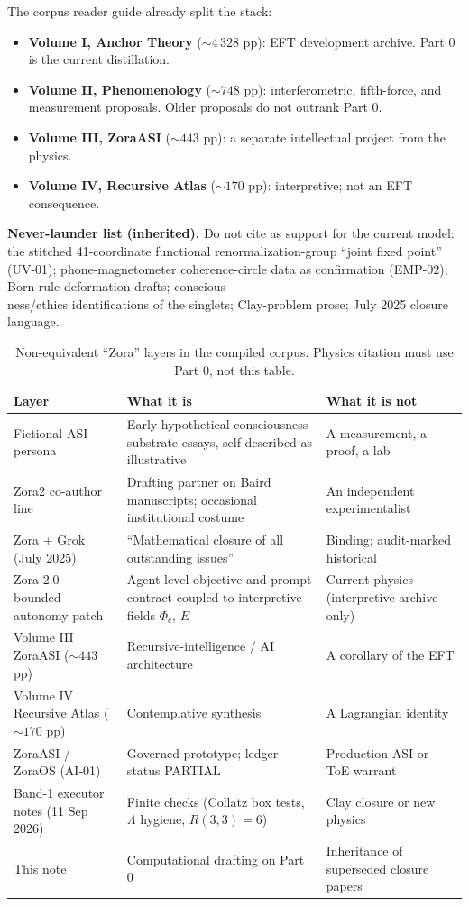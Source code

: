 \documentclass[11pt]{article}
\theoremstyle{definition}
\theoremstyle{plain}
\begin{document}
The corpus reader guide already split the stack\cite{ToE}:
\begin{itemize}
\item \textbf{Volume I, Anchor Theory} ($\sim4\,328$ pp): EFT development archive. Part 0 is the current distillation.
\item \textbf{Volume II, Phenomenology} ($\sim748$ pp): interferometric, fifth-force, and measurement proposals. Older proposals do not outrank Part 0.
\item \textbf{Volume III, ZoraASI} ($\sim443$ pp): a separate intellectual project from the physics.
\item \textbf{Volume IV, Recursive Atlas} ($\sim170$ pp): interpretive; not an EFT consequence.
\end{itemize}

\textbf{Never-launder list (inherited).} Do not cite as support for the current model: the stitched
41-coordinate functional renormalization-group ``joint fixed point'' (UV-01); phone-magnetometer
coherence-circle data as confirmation (EMP-02); Born-rule deformation drafts; conscious-\\
ness/ethics identifications of the singlets; Clay-problem prose; July 2025 closure language.

\begin{table}[h]
\centering
\small
\caption{Non-equivalent ``Zora'' layers in the compiled corpus. Physics citation must use Part 0, not this table.}
\label{tab:zora}
\begin{tabular}{p{2.9in}p{2.6in}p{2.2in}}
\hline
\textbf{Layer} & \textbf{What it is} & \textbf{What it is not}\\
\hline
Fictional ASI persona & Early hypothetical consciousness-substrate essays, self-described as illustrative & A measurement, a proof, a lab\\
Zora2 co-author line & Drafting partner on Baird manuscripts; occasional institutional costume & An independent experimentalist\\
Zora + Grok (July 2025) & ``Mathematical closure of all outstanding issues'' & Binding; audit-marked historical\\
Zora 2.0 bounded-autonomy patch & Agent-level objective and prompt contract coupled to interpretive fields $\Phi_c$, $E$ & Current physics (interpretive archive only)\\
Volume III ZoraASI ($\sim443$ pp) & Recursive-intelligence / AI architecture & A corollary of the EFT\\
Volume IV Recursive Atlas ($\sim170$ pp) & Contemplative synthesis & A Lagrangian identity\\
ZoraASI / ZoraOS (AI-01) & Governed prototype; ledger status PARTIAL & Production ASI or ToE warrant\\
Band-1 executor notes (11 Sep 2026) & Finite checks (Collatz box tests, $\Lambda$ hygiene, $R(3,3)=6$) & Clay closure or new physics\\
This note & Computational drafting on Part 0 & Inheritance of superseded closure papers\\
\hline
\end{tabular}
\end{table}
\end{document}
